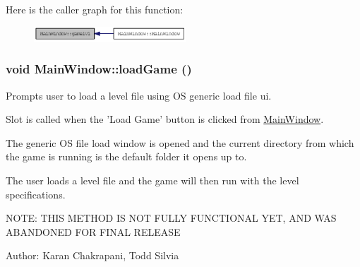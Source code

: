Here is the caller graph for this function:\nopagebreak
\begin{figure}[H]
\begin{center}
\leavevmode
\includegraphics[width=162pt]{class_main_window_a18edf6e25d25b890fb889dae523d45f9_icgraph}
\end{center}
\end{figure}
\hypertarget{class_main_window_af32531cf9be0011b3b3aa9cb1c159633}{
\subsubsection[{loadGame}]{\setlength{\rightskip}{0pt plus 5cm}void MainWindow::loadGame ()}}
\label{class_main_window_af32531cf9be0011b3b3aa9cb1c159633}
Prompts user to load a level file using OS generic load file ui.

Slot is called when the 'Load Game' button is clicked from \hyperlink{class_main_window}{MainWindow}.

The generic OS file load window is opened and the current directory from which the game is running is the default folder it opens up to.\par
 The user loads a level file and the game will then run with the level specifications.

NOTE: THIS METHOD IS NOT FULLY FUNCTIONAL YET, AND WAS ABANDONED FOR FINAL RELEASE

Author: Karan Chakrapani, Todd Silvia 


